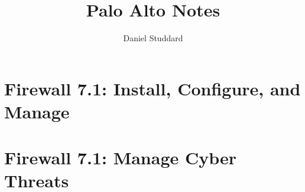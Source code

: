 \documentclass{report}
\author{Daniel Studdard}
\begin{document}
\title{Palo Alto Notes}
\maketitle
\tableofcontents
\setcounter{chapter}{100}
\chapter{Firewall 7.1: Install, Configure, and Manage}











\setcounter{chapter}{130}
\chapter{Firewall 7.1: Manage Cyber Threats}



\end{document}
